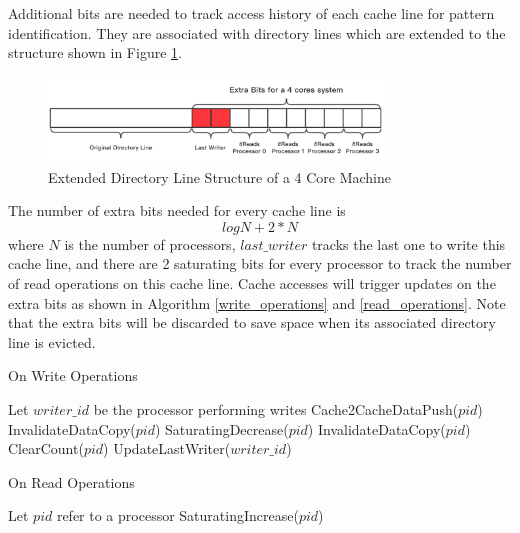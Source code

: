 \documentclass[conference]{IEEEtran}
\begin{document}
Additional bits are needed to track access history of each cache line for pattern identification. They are associated with directory lines which are extended to the structure shown in Figure \ref{dir_line}.

\begin{figure}[!h]
\centering
\captionsetup{justification=centering}
\includegraphics[width=3.5in]{dir_line.png}
\caption{Extended Directory Line Structure of a 4 Core Machine}
\label{dir_line}
\end{figure}
\FloatBarrier

The number of extra bits needed for every cache line is
\begin{equation*}
log N + 2 * N
\end{equation*}
where $N$ is the number of processors, $last\_writer$ tracks the last one to write this cache line, and there are 2 saturating bits for every processor to track the number of read operations on this cache line. Cache accesses will trigger updates on the extra bits as shown in Algorithm \ref{write_operations} and \ref{read_operations}. Note that the extra bits will be discarded to save space when its associated directory line is evicted.

\begin{algorithm}
\caption{On Write Operations}
\label{write_operations}
\begin{algorithmic}[1]
\State Let $writer\_id$ be the processor performing writes
     
            \State Cache2CacheDataPush($pid$) 
        \Else
            \State InvalidateDataCopy($pid$) 
        \EndIf
        \State SaturatingDecrease($pid$) 
    \EndFor
\Else
     
        \State InvalidateDataCopy($pid$) 
        \State ClearCount($pid$) 
    \EndFor
    \State UpdateLastWriter($writer\_id$)
\EndIf
\end{algorithmic}
\end{algorithm}

\begin{algorithm}
\caption{On Read Operations}
\label{read_operations}
\begin{algorithmic}[1]
\State Let $pid$ refer to a processor
    \State SaturatingIncrease($pid$) 
\EndFor
\end{algorithmic}
\end{algorithm}
\end{document}
